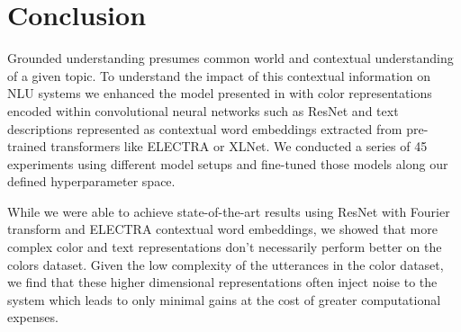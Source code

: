 \section{Conclusion}

Grounded understanding presumes common world and contextual understanding of a given topic. To understand the impact of this contextual information on NLU systems we enhanced the model presented in \citep{monroe-2017-colors} with color representations encoded within convolutional neural networks such as ResNet and text descriptions represented as contextual word embeddings extracted from pre-trained transformers like ELECTRA or XLNet. We conducted a series of 45 experiments using different model setups and fine-tuned those models along our defined hyperparameter space.

\par
While we were able to achieve state-of-the-art results using ResNet with Fourier transform and ELECTRA contextual word embeddings, we showed that more complex color and text representations don’t necessarily perform better on the colors dataset. Given the low complexity of the utterances in the color dataset, we find that these higher dimensional representations often inject noise to the system which leads to only minimal gains at the cost of greater computational expenses.

